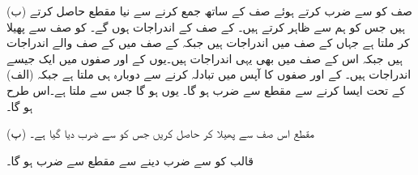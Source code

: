 (ب) \quad صف  کو  سے ضرب کرتے ہوئے صف  کے ساتھ جمع کرنے سے نیا مقطع حاصل کرتے ہیں جس کو ہم  سے ظاہر کرتے ہیں۔ کے صف  کے اندراجات  ہوں گے۔ کو  صف سے پھیلا کر  ملتا ہے جہاں   کے صف  میں  اندراجات ہیں جبکہ  کے صف  میں  کے صف  والے اندراجات  ہیں جبکہ اس کے صف  میں بھی یہی  اندراجات ہیں۔یوں  کے  اور  صفوں میں ایک جیسے اندراجات ہیں۔ کے  اور  صفوں کا آپس میں تبادلہ کرنے سے دوبارہ  ہی ملتا ہے جبکہ (الف) کے تحت ایسا کرنے سے مقطع  سے ضرب ہو گا۔ یوں  ہو گا جس سے  ملتا ہے۔اس طرح  ہو گا۔

(پ) \quad مقطع اس صف سے پھیلا کر حاصل کریں جس کو  سے ضرب دیا گیا ہے۔

  قالب کو  سے ضرب دینے سے مقطع  سے ضرب ہو گا۔

